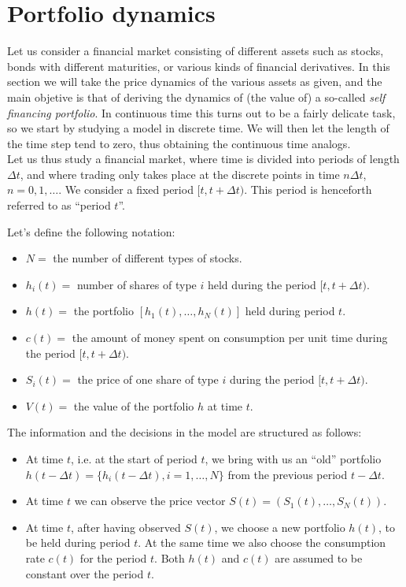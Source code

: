 \section{Portfolio dynamics} %
Let us consider a financial market consisting of different assets such as stocks, bonds with different maturities, or various kinds of financial derivatives. In this section we will take the price dynamics of the various assets as given, and the main objetive is that of deriving the dynamics of (the value of) a so-called \emph{self financing portfolio}. In continuous time this turns out to be a fairly delicate task, so we start by studying a model in discrete time. We will then let the length of the time step tend to zero, thus obtaining the continuous time analogs. \\
Let us thus study a financial market, where time is divided into periods of length $\Delta t$, and where trading only takes place at the discrete points in time $n\Delta t$, $n = 0, 1,\dots$. We consider a fixed period $[t, t + \Delta t)$. This period is henceforth referred to as “period $t$”.
\begin{definition} Let's define the following notation:
    \begin{itemize}
    \item $N =$ the number of different types of stocks.
    \item $h_i(t) =$ number of shares of type $i$ held during the period $[t, t + \Delta t)$.
    \item $h(t) =$ the portfolio $[h_1(t),\dots,h_N(t)]$ held during period $t$.
    \item $c(t) =$ the amount of money spent on consumption per unit time during the period $[t, t + \Delta t)$.
    \item $S_i(t) =$ the price of one share of type $i$ during the period $[t, t + \Delta t)$.
    \item $V(t) =$ the value of the portfolio $h$ at time $t$.
    \end{itemize}
\end{definition}
The information and the decisions in the model are structured as follows:
\begin{itemize}
    \item At time $t$, i.e. at the start of period $t$, we bring with us an “old” portfolio $h(t - \Delta t) = \{h_i(t - \Delta t), i = 1,\dots,N\}$ from the previous period $t - \Delta t$.
    \item At time $t$ we can observe the price vector $S(t)=(S_1(t),\dots,S_N(t))$.
    \item At time $t$, after having observed $S(t)$, we choose a new portfolio $h(t)$, to be held during period $t$. At the same time we also choose the consumption rate $c(t)$ for the period $t$. Both $h(t)$ and $c(t)$ are assumed to be constant over the period $t$.
\end{itemize}
